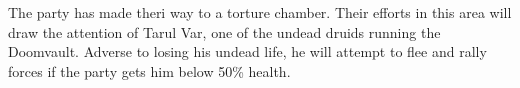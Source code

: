 The party has made theri way to a torture chamber.
Their efforts in this area will draw the attention of Tarul Var, one of the undead druids running the Doomvault.
Adverse to losing his undead life, he will attempt to flee and rally forces if the party gets him below 50\% health.